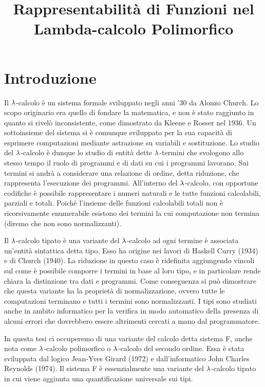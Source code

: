 \documentclass[]{marticle}
\title{\textbf{\huge Rappresentabilit\`a di Funzioni nel Lambda-calcolo
Polimorfico}}
\date{}
\begin{document}
\maketitle

\section{Introduzione}

Il $\lambda$-calcolo \`e un sistema formale sviluppato negli anni '30 da Alonzo
Church. Lo scopo originario era quello di fondare la matematica, e non \`e stato
raggiunto in quanto si rivel\`o inconsistente, come dimostrato da Kleene e Rosser
nel 1936. Un sottoinsieme del sistema si \`e comunque sviluppato per la sua
capacit\`a di esprimere computazioni mediante astrazione su variabili e
sostituzione. Lo studio del $\lambda$-calcolo \`e dunque lo studio di entit\`a dette
$\lambda$-termini che svologono allo stesso tempo il ruolo di programmi e di dati su
cui i programmi lavorano. Sui termini si andr\`a a considerare una relazione di
ordine, detta riduzione, che rappresenta l'esecuzione dei programmi. All'interno
del $\lambda$-calcolo, con opportune codifiche \`e possibile rappresentare i numeri
naturali e le tutte funzioni calcolabili, parziali e totali. Poich\`e l'insieme delle funzioni
calcolabili totali non \`e ricorsivamente enumerabile esistono dei termini la
cui computazione non termina (diremo che non sono normalizzanti).

Il $\lambda$-calcolo tipato \`e una variante del $\lambda$-calcolo ad ogni termine \`e
associata un'entit\`a sintattica detta tipo. Esso ha origine nei lavori di
Haskell Curry (1934) e di Church (1940).  La riduzione in questo caso \`e
ridefinita aggiungendo vincoli sul come \`e possibile comporre i termini in base
al loro tipo, e in particolare rende chiara la distinzione tra dati e programmi.
Come conseguenza si pu\`o dimostrare che questa variante ha la propriet\`a di
normalizzazione, ovvero tutte le computazioni terminano e tutti i termini sono
normalizzanti. I tipi sono studiati anche in ambito informatico per la verifica
in modo automatico della presenza di alcuni errori che dovrebbero essere
altrimenti cercati a mano dal programmatore.

In questa tesi ci occuperemo di una variante del calcolo detta sistema F, anche
nota come $\lambda$-calcolo polimorfico o $\lambda$-calcolo del secondo ordine. Essa \`e
stata sviluppata dal logico Jean-Yves Girard (1972) e dall'informatico John
Charles Reynolds (1974). Il sistema F \`e essenzialmente una variante del
$\lambda$-calcolo tipato in cui viene aggiunta una quantificazione universale sui
tipi.
\end{document}
